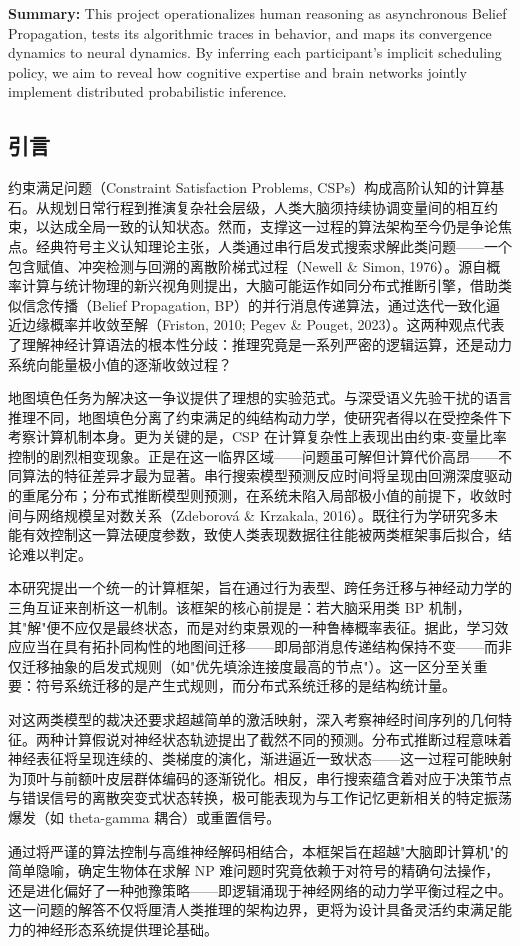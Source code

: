     \textbf{Summary:}  
    This project operationalizes human reasoning as asynchronous Belief Propagation, tests its algorithmic traces in behavior, and maps its convergence dynamics to neural dynamics. By inferring each participant’s implicit scheduling policy, we aim to reveal how cognitive expertise and brain networks jointly implement distributed probabilistic inference.

\subsection{引言}
约束满足问题（Constraint Satisfaction Problems, CSPs）构成高阶认知的计算基石。从规划日常行程到推演复杂社会层级，人类大脑须持续协调变量间的相互约束，以达成全局一致的认知状态。然而，支撑这一过程的算法架构至今仍是争论焦点。经典符号主义认知理论主张，人类通过串行启发式搜索求解此类问题——一个包含赋值、冲突检测与回溯的离散阶梯式过程（Newell \& Simon, 1976）。源自概率计算与统计物理的新兴视角则提出，大脑可能运作如同分布式推断引擎，借助类似信念传播（Belief Propagation, BP）的并行消息传递算法，通过迭代一致化逼近边缘概率并收敛至解（Friston, 2010; Pegev \& Pouget, 2023）。这两种观点代表了理解神经计算语法的根本性分歧：推理究竟是一系列严密的逻辑运算，还是动力系统向能量极小值的逐渐收敛过程？

地图填色任务为解决这一争议提供了理想的实验范式。与深受语义先验干扰的语言推理不同，地图填色分离了约束满足的纯结构动力学，使研究者得以在受控条件下考察计算机制本身。更为关键的是，CSP 在计算复杂性上表现出由约束-变量比率控制的剧烈相变现象。正是在这一临界区域——问题虽可解但计算代价高昂——不同算法的特征差异才最为显著。串行搜索模型预测反应时间将呈现由回溯深度驱动的重尾分布；分布式推断模型则预测，在系统未陷入局部极小值的前提下，收敛时间与网络规模呈对数关系（Zdeborová \& Krzakala, 2016）。既往行为学研究多未能有效控制这一算法硬度参数，致使人类表现数据往往能被两类框架事后拟合，结论难以判定。

本研究提出一个统一的计算框架，旨在通过行为表型、跨任务迁移与神经动力学的三角互证来剖析这一机制。该框架的核心前提是：若大脑采用类 BP 机制，其"解"便不应仅是最终状态，而是对约束景观的一种鲁棒概率表征。据此，学习效应应当在具有拓扑同构性的地图间迁移——即局部消息传递结构保持不变——而非仅迁移抽象的启发式规则（如"优先填涂连接度最高的节点"）。这一区分至关重要：符号系统迁移的是产生式规则，而分布式系统迁移的是结构统计量。

对这两类模型的裁决还要求超越简单的激活映射，深入考察神经时间序列的几何特征。两种计算假说对神经状态轨迹提出了截然不同的预测。分布式推断过程意味着神经表征将呈现连续的、类梯度的演化，渐进逼近一致状态——这一过程可能映射为顶叶与前额叶皮层群体编码的逐渐锐化。相反，串行搜索蕴含着对应于决策节点与错误信号的离散突变式状态转换，极可能表现为与工作记忆更新相关的特定振荡爆发（如 theta-gamma 耦合）或重置信号。

通过将严谨的算法控制与高维神经解码相结合，本框架旨在超越"大脑即计算机"的简单隐喻，确定生物体在求解 NP 难问题时究竟依赖于对符号的精确句法操作，还是进化偏好了一种弛豫策略——即逻辑涌现于神经网络的动力学平衡过程之中。这一问题的解答不仅将厘清人类推理的架构边界，更将为设计具备灵活约束满足能力的神经形态系统提供理论基础。